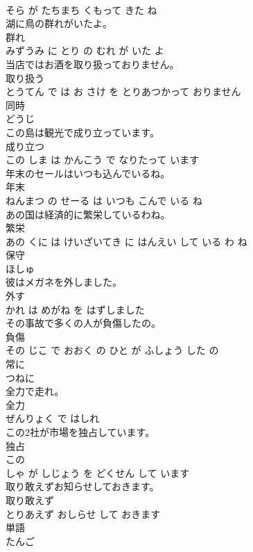 \documentclass[8pt]{extreport}
\begin{document}
\begin{CJK}{UTF8}{min}
\\	そら が たちまち くもって きた ね			
\\	湖に鳥の群れがいたよ。	
\\	群れ 
\\	みずうみ に とり の むれ が いた よ			
\\	当店ではお酒を取り扱っておりません。	
\\	取り扱う 
\\	とうてん で は お さけ を とりあつかって おりません			
\\	同時	
\\	どうじ			
\\	この島は観光で成り立っています。	
\\	成り立つ 
\\	この しま は かんこう で なりたって います			
\\	年末のセールはいつも込んでいるね。	
\\	年末 
\\	ねんまつ の せーる は いつも こんで いる ね			
\\	あの国は経済的に繁栄しているわね。	
\\	繁栄 
\\	あの くに は けいざいてき に はんえい して いる わ ね			
\\	保守	
\\	ほしゅ			
\\	彼はメガネを外しました。	
\\	外す 
\\	かれ は めがね を はずしました			
\\	その事故で多くの人が負傷したの。	
\\	負傷 
\\	その じこ で おおく の ひと が ふしょう した の			
\\	常に	
\\	つねに			
\\	全力で走れ。	
\\	全力 
\\	ぜんりょく で はしれ			
\\	この2社が市場を独占しています。	
\\	独占 
\\	この 
\\	しゃ が しじょう を どくせん して います			
\\	取り敢えずお知らせしておきます。	
\\	取り敢えず 
\\	とりあえず おしらせ して おきます			
\\	単語	
\\	たんご			

\end{CJK}
\end{document}

